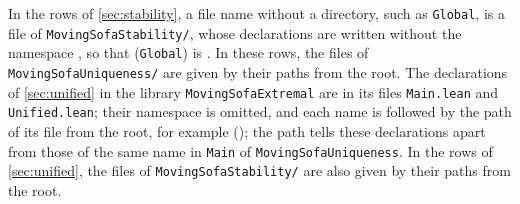 In the rows of \cref{sec:stability}, a file name without a directory, such as
\texttt{Global}, is a file of \texttt{MovingSofaStability/}, whose declarations
are written without the namespace , so that
 (\texttt{Global}) is
. In these rows, the files of
\texttt{MovingSofaUniqueness/} are given by their paths from the root. The
declarations of \cref{sec:unified} in the library \texttt{MovingSofaExtremal}
are in its files \texttt{Main.lean} and \texttt{Unified.lean}; their namespace
 is omitted, and each name is followed by the path of
its file from the root, for example 
(); the path tells these declarations apart
from those of the same name in \texttt{Main} of \texttt{MovingSofaUniqueness}.
In the rows of \cref{sec:unified}, the files of \texttt{MovingSofaStability/}
are also given by their paths from the root.

